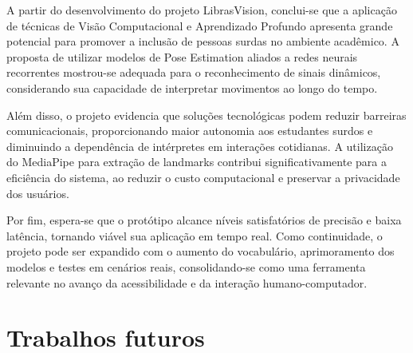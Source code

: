 
A partir do desenvolvimento do projeto LibrasVision, conclui-se que a aplicação de técnicas de Visão Computacional e Aprendizado Profundo apresenta grande potencial para promover a inclusão de pessoas surdas no ambiente acadêmico. A proposta de utilizar modelos de Pose Estimation aliados a redes neurais recorrentes mostrou-se adequada para o reconhecimento de sinais dinâmicos, considerando sua capacidade de interpretar movimentos ao longo do tempo.

Além disso, o projeto evidencia que soluções tecnológicas podem reduzir barreiras comunicacionais, proporcionando maior autonomia aos estudantes surdos e diminuindo a dependência de intérpretes em interações cotidianas. A utilização do MediaPipe para extração de landmarks contribui significativamente para a eficiência do sistema, ao reduzir o custo computacional e preservar a privacidade dos usuários.

Por fim, espera-se que o protótipo alcance níveis satisfatórios de precisão e baixa latência, tornando viável sua aplicação em tempo real. Como continuidade, o projeto pode ser expandido com o aumento do vocabulário, aprimoramento dos modelos e testes em cenários reais, consolidando-se como uma ferramenta relevante no avanço da acessibilidade e da interação humano-computador.

\section{Trabalhos futuros}

